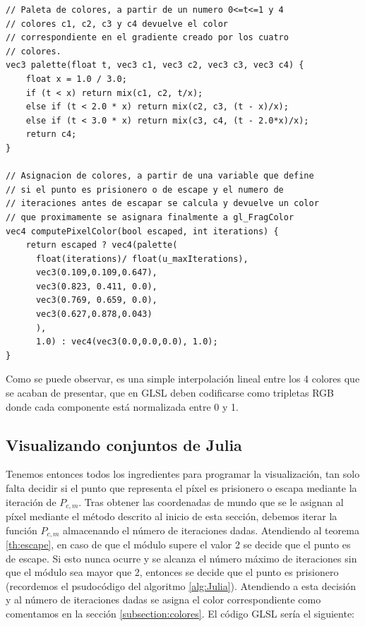 \begin{lstlisting}
// Paleta de colores, a partir de un numero 0<=t<=1 y 4 
// colores c1, c2, c3 y c4 devuelve el color 
// correspondiente en el gradiente creado por los cuatro 
// colores.
vec3 palette(float t, vec3 c1, vec3 c2, vec3 c3, vec3 c4) {
    float x = 1.0 / 3.0;
    if (t < x) return mix(c1, c2, t/x);
    else if (t < 2.0 * x) return mix(c2, c3, (t - x)/x);
    else if (t < 3.0 * x) return mix(c3, c4, (t - 2.0*x)/x);
    return c4;
}

// Asignacion de colores, a partir de una variable que define
// si el punto es prisionero o de escape y el numero de 
// iteraciones antes de escapar se calcula y devuelve un color 
// que proximamente se asignara finalmente a gl_FragColor
vec4 computePixelColor(bool escaped, int iterations) {
    return escaped ? vec4(palette(
      float(iterations)/ float(u_maxIterations),
      vec3(0.109,0.109,0.647), 
      vec3(0.823, 0.411, 0.0), 
      vec3(0.769, 0.659, 0.0), 
      vec3(0.627,0.878,0.043)
      ), 
      1.0) : vec4(vec3(0.0,0.0,0.0), 1.0);
}
\end{lstlisting}

Como se puede observar, es una simple interpolación lineal entre los 4 colores que se acaban de presentar, que en GLSL deben codificarse como tripletas RGB donde cada componente está normalizada entre 0 y 1.

\subsection{Visualizando conjuntos de Julia}
\label{subsection:grafica-julia}

Tenemos entonces todos los ingredientes para programar la visualización, tan solo falta decidir si el punto que representa el píxel es prisionero o escapa mediante la iteración de $P_{c,m}$. Tras obtener las coordenadas de mundo que se le asignan al píxel mediante el método descrito al inicio de esta sección, debemos iterar la función $P_{c,m}$ almacenando el número de iteraciones dadas. Atendiendo al teorema \ref{th:escape}, en caso de que el módulo supere el valor 2 se decide que el punto es de escape. Si esto nunca ocurre y se alcanza el número máximo de iteraciones sin que el módulo sea mayor que 2, entonces se decide que el punto es prisionero (recordemos el psudocódigo del algoritmo \ref{alg:Julia}). Atendiendo a esta decisión y al número de iteraciones dadas se asigna el color correspondiente como comentamos en la sección \ref{subsection:colores}. El código GLSL sería el siguiente:

